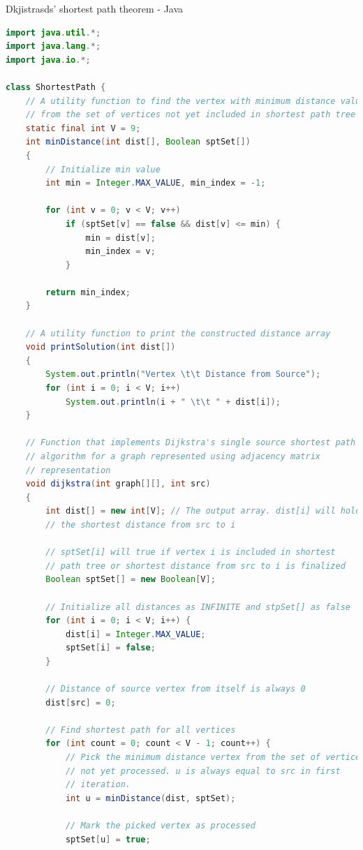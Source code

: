 \documentclass[11pt]{scrartcl}
\begin{document}
\vspace{5mm}
Dkjistrasds' shortest path theorem - Java
\begin{lstlisting}[language = java]
import java.util.*;
import java.lang.*;
import java.io.*;
 
class ShortestPath {
    // A utility function to find the vertex with minimum distance value,
    // from the set of vertices not yet included in shortest path tree
    static final int V = 9;
    int minDistance(int dist[], Boolean sptSet[])
    {
        // Initialize min value
        int min = Integer.MAX_VALUE, min_index = -1;
 
        for (int v = 0; v < V; v++)
            if (sptSet[v] == false && dist[v] <= min) {
                min = dist[v];
                min_index = v;
            }
 
        return min_index;
    }
 
    // A utility function to print the constructed distance array
    void printSolution(int dist[])
    {
        System.out.println("Vertex \t\t Distance from Source");
        for (int i = 0; i < V; i++)
            System.out.println(i + " \t\t " + dist[i]);
    }
 
    // Function that implements Dijkstra's single source shortest path
    // algorithm for a graph represented using adjacency matrix
    // representation
    void dijkstra(int graph[][], int src)
    {
        int dist[] = new int[V]; // The output array. dist[i] will hold
        // the shortest distance from src to i
 
        // sptSet[i] will true if vertex i is included in shortest
        // path tree or shortest distance from src to i is finalized
        Boolean sptSet[] = new Boolean[V];
 
        // Initialize all distances as INFINITE and stpSet[] as false
        for (int i = 0; i < V; i++) {
            dist[i] = Integer.MAX_VALUE;
            sptSet[i] = false;
        }
 
        // Distance of source vertex from itself is always 0
        dist[src] = 0;
 
        // Find shortest path for all vertices
        for (int count = 0; count < V - 1; count++) {
            // Pick the minimum distance vertex from the set of vertices
            // not yet processed. u is always equal to src in first
            // iteration.
            int u = minDistance(dist, sptSet);
 
            // Mark the picked vertex as processed
            sptSet[u] = true;
 

\end{lstlisting}
\end{document}
